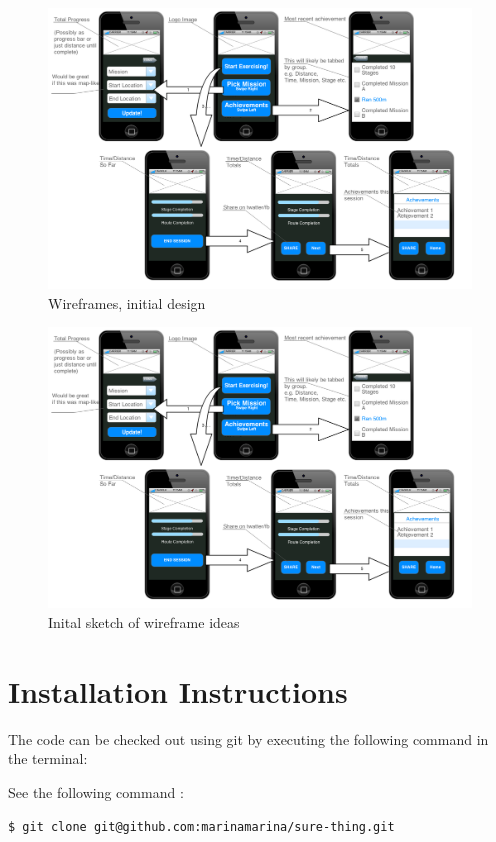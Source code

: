 \begin{figure}[H]
  \centering
  \includegraphics[width=\linewidth]{appendix/images/wireframes.png}
  \caption{Wireframes, initial design}
  \label{wireframes_1}
\end{figure}
\begin{figure}[H]
  \centering
  \includegraphics[width=\linewidth]{appendix/images/wireframes.png}
  \caption{Inital sketch of wireframe ideas}
  \label{wireframes_2}
\end{figure}

\chapter{Installation Instructions}
The code can be checked out using git by executing the following command in the terminal:

\noindent See the following command :
\begin{lstlisting}[language=bash]
  $ git clone git@github.com:marinamarina/sure-thing.git
\end{lstlisting}

